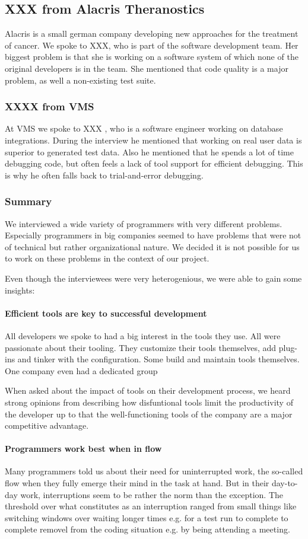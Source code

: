 \subsection{XXX from Alacris Theranostics} Alacris is a small german company developing new approaches for the treatment of cancer. We spoke to XXX, who is part of the software development team. Her biggest problem is that she is working on a software system of which none of the original developers is in the team. She mentioned that code quality is a major problem, as well a non-existing test suite.

\subsubsection{XXXX from VMS} At VMS we spoke to XXX , who is a software engineer working on database integrations. During the interview he mentioned that working on real user data is superior to generated test data. Also he mentioned that he spends a lot of time debugging code, but often feels a lack of tool support for efficient debugging. This is why he often falls back to trial-and-error debugging.

\subsubsection{Summary} We interviewed a wide variety of programmers with very different problems. Especially programmers in big companies seemed to have problems that were not of technical but rather organizational nature. We decided it is not possible for us to work on these problems in the context of our project.

Even though the interviewees were very heterogenious, we were able to gain some insights:

\paragraph{Efficient tools are key to successful development} All developers we spoke to had a big interest in the tools they use. All were passionate about their tooling. They customize their tools themselves, add plug-ins and tinker with the configuration. Some build and maintain tools themselves. One company even had a dedicated group

When asked about the impact of tools on their development process, we heard strong opinions from describing how disfuntional tools limit the productivity of the developer up to that the well-functioning tools of the company are a major competitive advantage.

\paragraph{Programmers work best when in flow} Many programmers told us about their need for uninterrupted work, the so-called flow when they fully emerge their mind in the task at hand. But in their day-to-day work, interruptions seem to be rather the norm than the exception. The threshold over what constitutes as an interruption ranged from small things like switching windows over waiting longer times e.g. for a test run to complete to complete removel from the coding situation e.g. by being attending a meeting.
